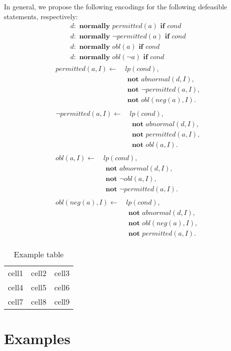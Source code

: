 In general, we propose the following encodings for the following defeasible statements, respectively:
\begin{gather}
    d: \textbf{ normally } permitted(a) \textbf{ if } cond \\
    d: \textbf{ normally } \neg permitted(a) \textbf{ if } cond \\
    d: \textbf{ normally } obl(a) \textbf{ if } cond \\
    d: \textbf{ normally } obl(\neg a) \textbf{ if } cond
\end{gather}
\begin{gather}
\begin{split}
    permitted(a, I) \leftarrow \
        & lp(cond), \\
        & \textbf{ not } abnormal(d, I), \\
        & \textbf{ not } \neg permitted(a, I), \\
        & \textbf{ not } obl(neg(a), I).
\end{split} \\
\begin{split}
    \neg permitted(a, I) \leftarrow \
        & lp(cond), \\
        & \textbf{ not } abnormal(d, I), \\
        & \textbf{ not } permitted(a, I), \\
        & \textbf{ not } obl(a, I).
\end{split} \\
\begin{split}
    obl(a, I) \leftarrow \
        & lp(cond), \\
        & \textbf{ not } abnormal(d, I), \\
        & \textbf{ not } \neg obl(a, I), \\
        & \textbf{ not } \neg permitted(a, I).
\end{split} \\
\begin{split}
    obl(neg(a), I) \leftarrow \
        & lp(cond), \\
        & \textbf{ not } abnormal(d, I), \\
        & \textbf{ not } obl(neg(a), I), \\
        & \textbf{ not } permitted(a, I).
\end{split}
\end{gather}

\begin{table}[h]
    \begin{tabular}{ c c c }
        cell1 & cell2 & cell3 \\
        cell4 & cell5 & cell6 \\
        cell7 & cell8 & cell9
    \end{tabular}
    \caption{Example table}
\end{table}

\section{Examples}
